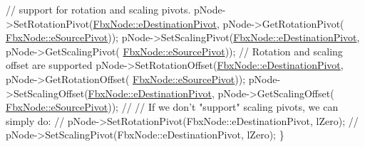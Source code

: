 \begin{DoxyCode}
   \textcolor{comment}{// support for rotation and scaling pivots.}
   pNode->SetRotationPivot(\hyperlink{class_fbx_node_ae62b7311ac4727654cdf1ebd5cbf7343a9822ce03ebfd64b85ca6a570201eb3cc}{FbxNode::eDestinationPivot}, pNode->GetRotationPivot(
      \hyperlink{class_fbx_node_ae62b7311ac4727654cdf1ebd5cbf7343ae8ed37a5c7e41f8d1cec9d3fa8424b69}{FbxNode::eSourcePivot}));    
   pNode->SetScalingPivot(\hyperlink{class_fbx_node_ae62b7311ac4727654cdf1ebd5cbf7343a9822ce03ebfd64b85ca6a570201eb3cc}{FbxNode::eDestinationPivot}, pNode->GetScalingPivot(
      \hyperlink{class_fbx_node_ae62b7311ac4727654cdf1ebd5cbf7343ae8ed37a5c7e41f8d1cec9d3fa8424b69}{FbxNode::eSourcePivot}));    
   \textcolor{comment}{// Rotation and scaling offset are supported}
   pNode->SetRotationOffset(\hyperlink{class_fbx_node_ae62b7311ac4727654cdf1ebd5cbf7343a9822ce03ebfd64b85ca6a570201eb3cc}{FbxNode::eDestinationPivot}, pNode->GetRotationOffset(
      \hyperlink{class_fbx_node_ae62b7311ac4727654cdf1ebd5cbf7343ae8ed37a5c7e41f8d1cec9d3fa8424b69}{FbxNode::eSourcePivot}));    
   pNode->SetScalingOffset(\hyperlink{class_fbx_node_ae62b7311ac4727654cdf1ebd5cbf7343a9822ce03ebfd64b85ca6a570201eb3cc}{FbxNode::eDestinationPivot}, pNode->GetScalingOffset(
      \hyperlink{class_fbx_node_ae62b7311ac4727654cdf1ebd5cbf7343ae8ed37a5c7e41f8d1cec9d3fa8424b69}{FbxNode::eSourcePivot}));
   \textcolor{comment}{//}
   \textcolor{comment}{// If we don't "support" scaling pivots, we can simply do:}
   \textcolor{comment}{// pNode->SetRotationPivot(FbxNode::eDestinationPivot, lZero);}
   \textcolor{comment}{// pNode->SetScalingPivot(FbxNode::eDestinationPivot, lZero);}
\}
\end{DoxyCode}
